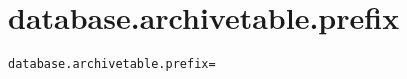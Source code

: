 \section{database.archivetable.prefix}
\label{configuration:DatabaseArchivetablePrefix}
\AvailableInJavaOnly{\TODO}
\begin{lstlisting}[style=Props,caption={Usage example for \textit{database.archivetable.prefix}}]
database.archivetable.prefix=
\end{lstlisting}